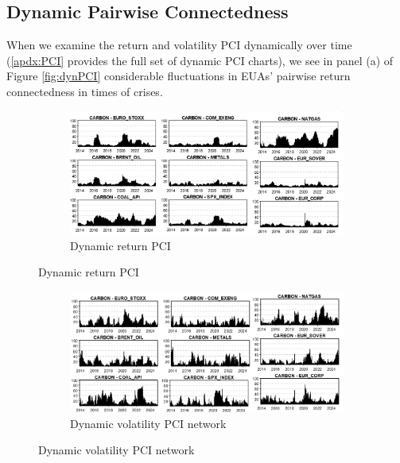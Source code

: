 \documentclass[preprint, 3p,
authoryear]{elsarticle} %
\begin{document}
\hypertarget{dynamic-pairwise-connectedness}{%
\subsection{Dynamic Pairwise
Connectedness}\label{dynamic-pairwise-connectedness}}

When we examine the return and volatility PCI dynamically over time
(\ref{apdx:PCI} provides the full set of dynamic PCI charts), we see in
panel (a) of Figure \ref{fig:dynPCI} considerable fluctuations in EUAs'
pairwise return connectedness in times of crises.

\begin{figure}[!htb]
  \caption{Dynamic Return and Volatility Pairwise Connectedness Index (PCI) (Jan 2013 – Jan 2025)}
  \label{fig:dynPCI}
    \centering
      \begin{subfigure}[b]{\textwidth}
        \caption{Dynamic return PCI}
        \label{fig:dynretPCI}
        \centering
        \includegraphics[width = 0.9\linewidth]{5aDynRetPCI}
      \end{subfigure}
\end{figure}
\begin{figure}[!htb]
\ContinuedFloat
      \begin{subfigure}[b]{\textwidth}
        \caption{Dynamic volatility PCI network}
        \label{fig:dynvolPCI}
        \centering
        \includegraphics[width = 0.9\linewidth]{5bDynVolPCI}
      \end{subfigure}
\end{figure}
\end{document}
